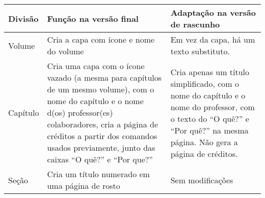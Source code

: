 \begin{table}[H]
	\centering\small
	\begin{tabular}{l*{2}{p{.4\linewidth}}}
		\toprule
		Divisão               & Função na versão final                                                                                                                                                                                                                                                                                                                                                            & Adaptação na versão de rascunho                                 \\
		\midrule
		Volume                & Cria a capa com ícone e nome do volume                                                                                                                                                                                                                                                                                                                                            & Em vez da capa, há um texto substituto.                         \\
		\addlinespace
		Capítulo              & Cria uma capa com o ícone vazado (a mesma para capítulos de um mesmo volume),
		com o nome do capítulo e o nome d(os) professor(es) colaboradores, cria a
		página de créditos a partir dos comandos usados previamente, junto das
		caixas \enquote{O quê?} e \enquote{Por que?}
		                      & Cria apenas um título simplificado, com o nome do capítulo e o nome do professor,
		com o texto do \enquote{O quê?} e \enquote{Por quê?} na mesma página. Não gera a página de créditos.                                                                                                                                                                                                                                                                                                                                                                        \\
		\addlinespace
		Seção                 & Cria um título numerado em uma página de rosto                                                                                                                                                                                                                                                                                                                                    & Sem modificações                                                \\

\end{tabular}
\end{table}
